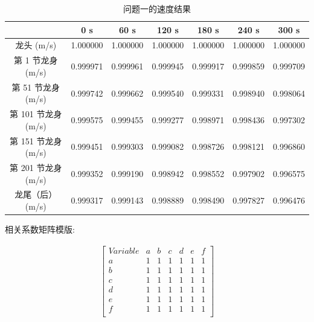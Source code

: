 \documentclass[a4paper]{article}
\begin{document}
		\begin{table}[H] %
		\captionsetup{skip=4pt} %
		\caption{问题一的速度结果}
		\centering
		\setlength{\arrayrulewidth}{0.5pt} %
		\begin{tabular}{|c|c|c|c|c|c|c|} %
			\hline
			& 0 s & 60 s & 120 s & 180 s & 240 s & 300 s \\ \hline
			龙头 (m/s)      &    1.000000 &	1.000000 &	1.000000 &	1.000000 &	1.000000 &	1.000000 \\ \hline
			第 1 节龙身 (m/s) &  0.999971 &	0.999961 &	0.999945 &	0.999917 &	0.999859 &	0.999709 \\ \hline
			第 51 节龙身 (m/s) & 0.999742 &	0.999662 &	0.999540 &	0.999331 &	0.998940 &	0.998064 \\ \hline
			第 101 节龙身 (m/s) &0.999575 &	0.999455 &	0.999277 &	0.998971 &	0.998436 &	0.997302 \\ \hline
			第 151 节龙身 (m/s) &0.999451 &	0.999303 &	0.999082 &	0.998726 &	0.998121 &	0.996860 \\ \hline
			第 201 节龙身 (m/s) &0.999352 &	0.999190 &	0.998942 &	0.998552 &	0.997902 &	0.996575 \\ \hline
			龙尾（后） (m/s) &   0.999317 &	0.999143 &	0.998889 &	0.998490 &	0.997827 &	0.996476 \\ \hline
		\end{tabular}
		\end{table}

		相关系数矩阵模版:

		\begin{gather*}
			\begin{bmatrix}
				Variable & a & b & c & d & e & f \\
				a & 1 & 1 & 1 & 1 & 1 & 1 \\
				b & 1 & 1 & 1 & 1 & 1 & 1 \\
				c & 1 & 1 & 1 & 1 & 1 & 1 \\
				d & 1 & 1 & 1 & 1 & 1 & 1 \\
				e & 1 & 1 & 1 & 1 & 1 & 1 \\
				f & 1 & 1 & 1 & 1 & 1 & 1 \\
			\end{bmatrix}
		\end{gather*}
\end{document}
